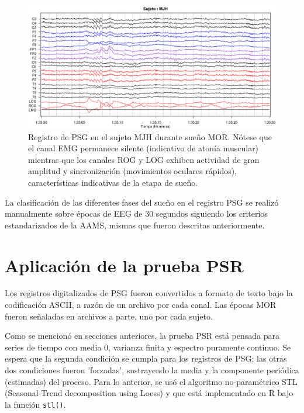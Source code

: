 \documentclass[12pt,a4paper]{mitthesis}
\begin{document}
\begin{figure}
\centering
\includegraphics[width=\linewidth]
{./img_ejemplos/MJH_190_PDG_lucirse_PSG.pdf}
\caption{Registro de PSG en el sujeto MJH durante sue\~no MOR. N\'otese que el canal EMG permanece 
silente (indicativo de aton\'ia muscular) mientras que los canales ROG y LOG exhiben actividad de 
gran amplitud y sincronizaci\'on (movimientos oculares r\'apidos), caracter\'isticas indicativas de
la etapa de sue\~no.}
\label{ejemplos_mor}
\end{figure}

La clasificaci\'on de las diferentes fases del sue\~no en el registro PSG se realiz\'o manualmente 
sobre \'epocas de EEG de 30 segundos siguiendo los criterios 
estandarizados de la AAMS\cite{Hori01}, mismas que fueron descritas anteriormente.


\section{Aplicaci\'on de la prueba PSR}

Los registros digitalizados de PSG fueron convertidos a formato de texto bajo la codificaci\'on 
ASCII, a raz\'on de un archivo por cada canal. 
Las \'epocas MOR fueron se\~naladas en archivos a parte, uno por cada sujeto.

Como se mencion\'o en secciones anteriores, la prueba PSR est\'a pensada para series de tiempo con 
media 0, varianza finita y espectro puramente continuo. Se espera que la segunda condici\'on se 
cumpla para los registros de PSG; las otras dos condiciones fueron 'forzadas', sustrayendo la media 
y la componente peri\'odica (estimadas) del proceso.
Para lo anterior, se us\'o el algoritmo no-param\'etrico STL (Seasonal-Trend decomposition using 
Loess) \cite{Cleveland1990} y que est\'a implementado en R bajo la funci\'on \texttt{stl()}.
\end{document}
